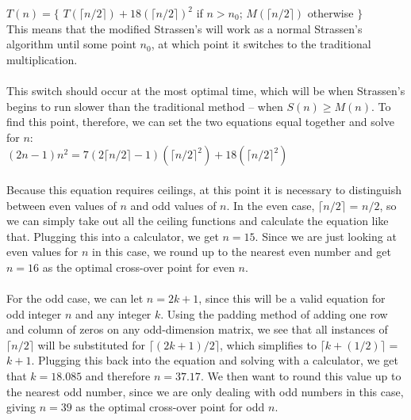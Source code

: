 \documentclass[11pt]{article}
\begin{document}
$T(n) = \{$ $T(\lceil n/2 \rceil) + 18(\lceil n/2 \rceil)^2$ if $n > n_0$;  $M(\lceil n/2 \rceil)$ otherwise $\}$ \\
This means that the modified Strassen's will work as a normal Strassen's algorithm until some point $n_0$, at which point it switches to the traditional multiplication. \\\\
This switch should occur at the most optimal time, which will be when Strassen's begins to run slower than the traditional method -- when $S(n) \geq M(n)$. To find this point, therefore, we can set the two equations equal together and solve for $n$: \\
$(2n - 1)n^2 = 7(2\lceil n/2 \rceil - 1)(\lceil n/2\rceil^2) + 18(\lceil n/2\rceil^2)$ \\\\
Because this equation requires ceilings, at this point it is necessary to distinguish between even values of $n$ and odd values of $n$. In the even case, $\lceil n/2 \rceil$ = $n/2$, so we can simply take out all the ceiling functions and calculate the equation like that. Plugging this into a calculator, we get $n = 15$. Since we are just looking at even values for $n$ in this case, we round up to the nearest even number and get $n = 16$ as the optimal cross-over point for even $n$. \\\\
For the odd case, we can let $n = 2k + 1$, since this will be a valid equation for odd integer $n$ and any integer $k$. Using the padding method of adding one row and column of zeros on any odd-dimension matrix, we see that all instances of $\lceil n/2 \rceil$ will be substituted for $\lceil (2k + 1)/2 \rceil$, which simplifies to $\lceil k + (1/2) \rceil$ = $k + 1$. Plugging this back into the equation and solving with a calculator, we get that $k = 18.085$ and therefore $n = 37.17$. We then want to round this value up to the nearest odd number, since we are only dealing with odd numbers in this case, giving $n = 39$ as the optimal cross-over point for odd $n$. \\\\
\end{document}
